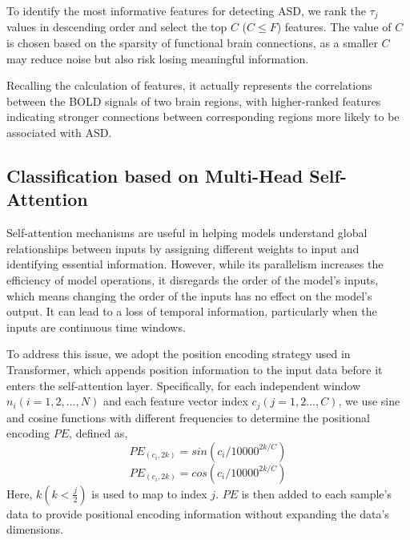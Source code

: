 \documentclass[journal,twoside,web]{ieeecolor}
\begin{document}
To identify the most informative features for detecting ASD, we rank the $\tau_{j}$ values in descending order and select the top $C$ ($C\leq F$) features. The value of $C$ is chosen based on the sparsity of functional brain connections, as a smaller $C$ may reduce noise but also risk losing meaningful information. 

Recalling the calculation of features, it actually represents the correlations between the BOLD signals of two brain regions, with higher-ranked features indicating stronger connections between corresponding regions more likely to be associated with ASD.
\subsection{Classification based on Multi-Head Self-Attention}
Self-attention mechanisms are useful in helping models understand global relationships between inputs by assigning different weights to input and identifying essential information. However, while its parallelism increases the efficiency of  model operations, it disregards the order of the model's inputs, which means changing the order of the  inputs has no effect on the model's output\cite{litjens2017survey}. It can lead to a loss of temporal information, particularly when the inputs are continuous time windows.

To address this issue, we adopt the position encoding strategy used in  Transformer\cite{vaswani2017attention}, which appends position information to the input data before it enters the self-attention layer. Specifically, for each independent window $n_i(i=1,2,..., N)$ and each feature vector index $c_j(j=1,2..., C)$, we use sine and cosine functions with different frequencies to determine the positional encoding $PE$, defined as,
\begin{equation}
	PE_{(c_i,2k)}=sin(c_i/10000^{2k/C})
\end{equation}
\begin{equation}
	PE_{(c_i,2k)}=cos(c_i/10000^{2k/C})
\end{equation}
Here, $k(k<\frac{j}{2})$ is used to map to index $j$. $PE$ is then added to each sample's data to provide positional encoding information without expanding the data's dimensions.
\end{document}
